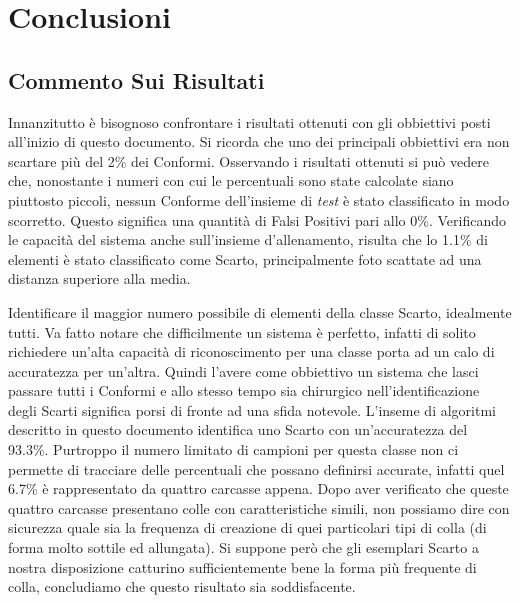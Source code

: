 
\chapter{Conclusioni}

\section{Commento Sui Risultati}
Innanzitutto è bisognoso confrontare i risultati ottenuti con gli obbiettivi posti all'inizio di questo documento.
Si ricorda che uno dei principali obbiettivi era non scartare più del 2\% dei Conformi.
Osservando i risultati ottenuti si può vedere che, nonostante i numeri con cui le percentuali sono state calcolate siano piuttosto piccoli, nessun Conforme dell'insieme di \textit{test} è stato classificato in modo scorretto.
Questo significa una quantità di Falsi Positivi pari allo 0\%.
Verificando le capacità del sistema anche sull'insieme d'allenamento, risulta che lo 1.1\% di elementi è stato classificato come Scarto, principalmente foto scattate ad una distanza superiore alla media.

Identificare il maggior numero possibile di elementi della classe Scarto, idealmente tutti.
Va fatto notare che difficilmente un sistema è perfetto, infatti di solito richiedere un'alta capacità di riconoscimento per una classe porta ad un calo di accuratezza per un'altra.
Quindi l'avere come obbiettivo un sistema che lasci passare tutti i Conformi e allo stesso tempo sia chirurgico nell'identificazione degli Scarti significa porsi di fronte ad una sfida notevole.
L'inseme di algoritmi descritto in questo documento identifica uno Scarto con un'accuratezza del 93.3\%.
Purtroppo il numero limitato di campioni per questa classe non ci permette di tracciare delle percentuali che possano definirsi accurate, infatti quel 6.7\% è rappresentato da quattro carcasse appena.
Dopo aver verificato che queste quattro carcasse presentano colle con caratteristiche simili, non possiamo dire con sicurezza quale sia la frequenza di creazione di quei particolari tipi di colla (di forma molto sottile ed allungata).
Si suppone però che gli esemplari Scarto a nostra disposizione catturino sufficientemente bene la forma più frequente di colla, concludiamo che questo risultato sia soddisfacente.

